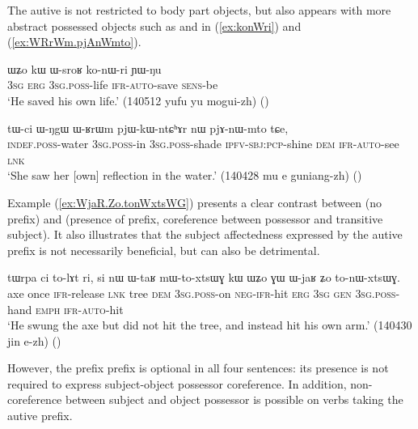 The autive is not restricted to body part objects, but also appears with more abstract possessed objects such as  and  in (\ref{ex:konWri}) and (\ref{ex:WRrWm.pjAnWmto}).

\begin{exe}
\ex \label{ex:konWri}
\gll ɯʑo kɯ ɯ-sroʁ ko-nɯ-ri ɲɯ-ŋu \\
\textsc{3sg} \textsc{erg} \textsc{3sg}.\textsc{poss}-life \textsc{ifr}-\textsc{auto}-save \textsc{sens}-be \\
\glt `He saved his own life.' (140512 yufu yu mogui-zh)
()
\end{exe}

\begin{exe}
\ex \label{ex:WRrWm.pjAnWmto}
\gll tɯ-ci ɯ-ŋgɯ ɯ-ʁrɯm pjɯ-kɯ-ntɕʰɤr nɯ pjɤ-nɯ-mto tɕe,  \\
\textsc{indef}.\textsc{poss}-water \textsc{3sg}.\textsc{poss}-in \textsc{3sg}.\textsc{poss}-shade \textsc{ipfv}-\textsc{sbj}:\textsc{pcp}-shine \textsc{dem} \textsc{ifr}-\textsc{auto}-see \textsc{lnk} \\
\glt `She saw her [own] reflection in the water.' (140428 mu e guniang-zh)
()
\end{exe}

Example (\ref{ex:WjaR.Zo.tonWxtsWG}) presents a clear contrast between  (no  prefix) and  (presence of  prefix, coreference between possessor and transitive subject). It also illustrates that the subject affectedness expressed by the autive prefix is not necessarily beneficial, but can also be detrimental. 

\begin{exe}
\ex \label{ex:WjaR.Zo.tonWxtsWG}
\gll tɯrpa ci to-lɤt ri, si nɯ ɯ-taʁ mɯ-to-xtsɯɣ kɯ ɯʑo ɣɯ ɯ-jaʁ ʑo to-nɯ-xtsɯɣ. \\
axe once \textsc{ifr}-release \textsc{lnk} tree \textsc{dem} \textsc{3sg}.\textsc{poss}-on \textsc{neg}-\textsc{ifr}-hit \textsc{erg} \textsc{3sg} \textsc{gen} \textsc{3sg}.\textsc{poss}-hand \textsc{emph} \textsc{ifr}-\textsc{auto}-hit \\
\glt `He swung the axe but did not hit the tree, and instead hit his own arm.' (140430 jin e-zh)
()
\end{exe}

However, the   prefix prefix is optional in all four sentences: its presence is not required to express subject-object possessor coreference. In addition, non-coreference between subject and object possessor is possible on verbs  taking the autive prefix.

